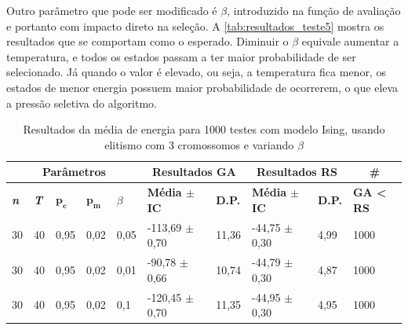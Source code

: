 Outro parâmetro que pode ser modificado é \(\beta\), introduzido na função de avaliação e portanto com impacto direto na seleção. A \autoref{tab:resultados_teste5} mostra os resultados que se comportam como o esperado. Diminuir o \(\beta\) equivale aumentar a temperatura, e todos os estados passam a ter maior probabilidade de ser selecionado. Já quando o valor é elevado, ou seja, a temperatura fica menor, os estados de menor energia possuem maior probabilidade de ocorrerem, o que eleva a pressão seletiva do algoritmo. 

\begin{table}[h!]
	\centering
	\begin{tabular}{|l|l|l|l|l|l|l|l|l|l|}
		\hline
		\multicolumn{5}{|c|}{\textbf{Parâmetros}}                                                    & \multicolumn{2}{c|}{\textbf{Resultados GA}}                                        & \multicolumn{2}{c|}{\textbf{Resultados RS}}                                        & \multicolumn{1}{c|}{\textbf{\#}}                      \\ \hline
		\textbf{\textit{n}} & \textbf{\textit{T}} & $\bm{p_c}$ & $\bm{p_m}$ & $\beta$ & \textbf{Média $\pm$ IC} & \textbf{D.P.} & \textbf{Média $\pm$ IC} & \textbf{D.P.} & \textbf{GA < RS} \\ \hline
		30                          & 40                          & 0,95        & 0,02  & 0,05      & -113,69 $\pm$ 0,70                           & 11,36                          & -44,75 $\pm$ 0,30                            & 4,99                           & 1000                                      \\ \hline
		30                          & 40                          & 0,95        & 0,02 & 0,01      & -90,78 $\pm$ 0,66                            & 10,74                          & -44,79 $\pm$ 0,30                            & 4,87                           & 1000                                      \\ \hline
		30                          & 40                          & 0,95        & 0,02 & 0,1      & -120,45 $\pm$ 0,70                            & 11,35                          & -44,95 $\pm$ 0,30                            & 4,95                           & 1000                                      \\ \hline
	\end{tabular}
	\caption{Resultados da média de energia para 1000 testes com modelo Ising, usando elitismo com 3 cromossomos e variando \(\beta\)}
	\label{tab:resultados_teste5}
\end{table}

